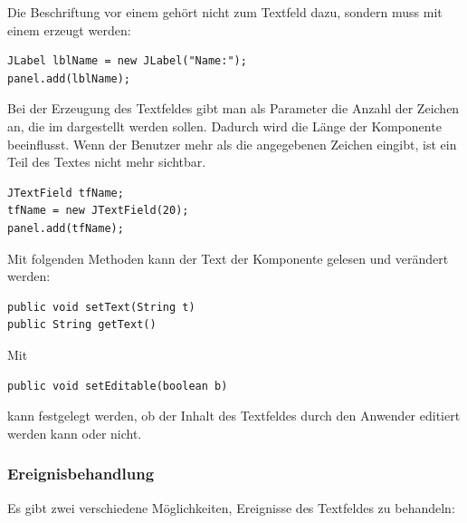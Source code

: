 Die Beschriftung vor einem  gehört nicht zum Textfeld dazu,
sondern muss mit einem  erzeugt werden:

\begin{lstlisting}
JLabel lblName = new JLabel("Name:");
panel.add(lblName);
\end{lstlisting}

Bei der Erzeugung des Textfeldes gibt man als Parameter die Anzahl der Zeichen
an, die im  dargestellt werden sollen. Dadurch wird die
Länge der Komponente beeinflusst. Wenn der Benutzer mehr als die angegebenen
Zeichen eingibt, ist ein Teil des Textes nicht mehr sichtbar.

\begin{lstlisting}
JTextField tfName;
tfName = new JTextField(20);
panel.add(tfName);
\end{lstlisting}

Mit folgenden Methoden kann der Text der Komponente gelesen und verändert werden:

\begin{lstlisting}
public void setText(String t)
public String getText()
\end{lstlisting}

Mit

\begin{lstlisting}
public void setEditable(boolean b)
\end{lstlisting}

kann festgelegt werden, ob der Inhalt des Textfeldes durch den Anwender
editiert werden kann oder nicht.

\subsubsection{Ereignisbehandlung}

Es gibt zwei verschiedene Möglichkeiten, Ereignisse des Textfeldes zu
behandeln:

